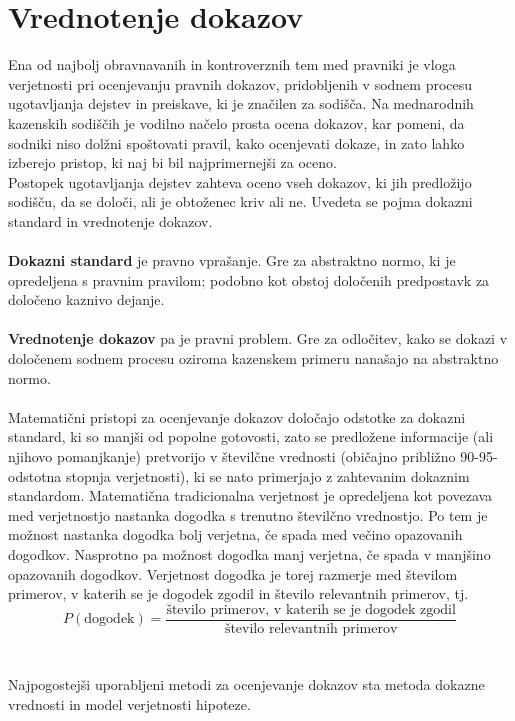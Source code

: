 \documentclass[fin1, tisk]{fmfdelo}
\theoremstyle{definition}
\theoremstyle{trditev}
\theoremstyle{izrek}
\begin{document}
\section{Vrednotenje dokazov}
Ena od najbolj obravnavanih in kontroverznih tem med pravniki je vloga verjetnosti pri ocenjevanju pravnih dokazov, pridobljenih v sodnem procesu 
ugotavljanja dejstev in preiskave, ki je značilen za sodišča. Na mednarodnih kazenskih sodiščih je vodilno načelo prosta ocena dokazov, kar pomeni, 
da sodniki niso dolžni spoštovati pravil, kako ocenjevati dokaze, in zato lahko izberejo pristop, ki naj bi bil najprimernejši za oceno.\\
Postopek ugotavljanja dejstev zahteva oceno vseh dokazov, ki jih predložijo sodišču, da se določi, ali je obtoženec kriv 
ali ne. Uvedeta se pojma dokazni standard in vrednotenje dokazov.\\\\
\textbf{Dokazni standard} je pravno vprašanje. Gre za abstraktno normo, ki je opredeljena s pravnim pravilom; podobno kot obstoj 
določenih predpostavk za določeno kaznivo dejanje.\\\\
\textbf{Vrednotenje dokazov} pa je pravni problem. Gre za odločitev, kako se dokazi v določenem sodnem procesu oziroma kazenskem primeru 
nanašajo na abstraktno normo.\\\\
Matematični pristopi za ocenjevanje dokazov določajo odstotke za dokazni standard, ki so manjši od popolne gotovosti, zato se 
predložene informacije (ali njihovo pomanjkanje) pretvorijo v številčne vrednosti (običajno približno 90-95-odstotna stopnja verjetnosti), ki se nato 
primerjajo z zahtevanim dokaznim standardom. Matematična tradicionalna verjetnost je opredeljena kot povezava med verjetnostjo 
nastanka dogodka s trenutno številčno vrednostjo. Po tem je možnost nastanka dogodka bolj verjetna, če spada med večino opazovanih dogodkov. Nasprotno 
pa možnost dogodka manj verjetna, če spada v manjšino opazovanih dogodkov. Verjetnost dogodka je torej razmerje med številom primerov, v katerih se je dogodek 
zgodil in število relevantnih primerov, tj.\vspace{2mm}
\[
    P(\text{dogodek}) = \frac{\text{število primerov, v katerih se je dogodek zgodil}}{\text{število relevantnih primerov}}
\]\\\\
Najpogostejši uporabljeni metodi za ocenjevanje dokazov sta metoda dokazne vrednosti in model verjetnosti hipoteze.\\
\end{document}
